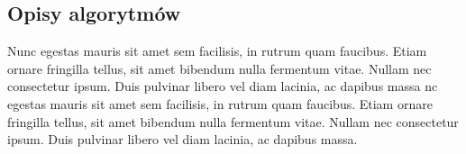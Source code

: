 \subsection{Opisy algorytmów}
Nunc egestas mauris sit amet sem facilisis, in rutrum quam faucibus. Etiam ornare fringilla tellus, sit amet bibendum nulla fermentum vitae. Nullam nec consectetur ipsum. Duis pulvinar libero vel diam lacinia, ac dapibus massa nc egestas mauris sit amet sem facilisis, in rutrum quam faucibus. Etiam ornare fringilla tellus, sit amet bibendum nulla fermentum vitae. Nullam nec consectetur ipsum. Duis pulvinar libero vel diam lacinia, ac dapibus massa.



